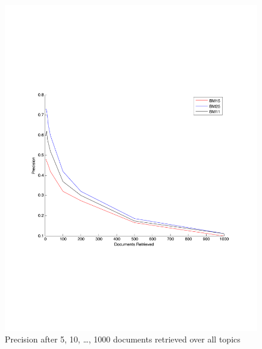 \documentclass[letterpaper,11pt]{article}
\begin{document}
\vspace{5cm}
\begin{figure}[h]
\centering
\includegraphics[scale = 0.75]{dr.pdf}
\caption{Precision after 5, 10, \dots, 1000 documents retrieved over all topics}

\end{figure}

\newpage 
\end{document}
